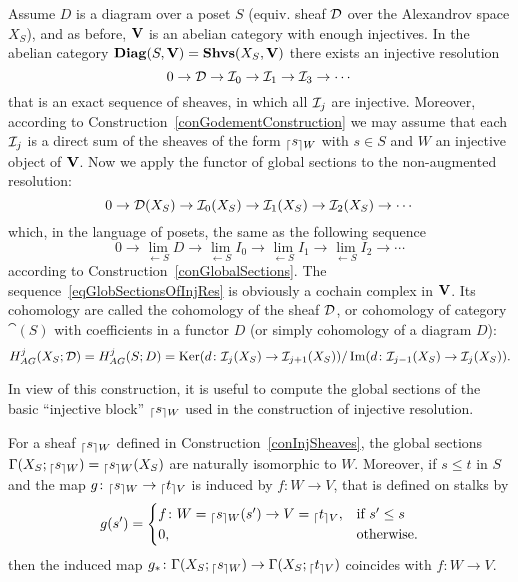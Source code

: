 \begin{con}\label{conSheafCohomDerivedStyle}
Assume $D$ is a diagram over a poset $S$ (equiv. sheaf $\mathcal{D}$ over the Alexandrov space $X_S$), and as before, $\mathbf{V}$ is an abelian category with enough injectives. In the abelian category $\mathbf{Diag}(S,\mathbf{V})=\mathbf{Shvs}(X_S,\mathbf{V})$ there exists an injective resolution
\begin{equation}\label{eqInjSheaf}
0\to \mathcal{D}\to\mathcal{I}_0\to\mathcal{I}_1\to\mathcal{I}_3\to\cdots
\end{equation}
that is an exact sequence of sheaves, in which all $\mathcal{I}_j$ are injective. Moreover, according to Construction~\ref{conGodementConstruction} we may assume that each $\mathcal{I}_j$ is a direct sum of the sheaves of the form ${_{\lceil}s_{\rceil W}}$ with $s\in S$ and $W$ an injective object of $\mathbf{V}$. Now we apply the functor of global sections to the non-augmented resolution:
\begin{equation}\label{eqGlobSectionsOfInjRes}
0\to\mathcal{D}(X_S)\to\mathcal{I}_0(X_S)\to\mathcal{I}_1(X_S)\to\mathcal{I}_2(X_S)\to\cdots
\end{equation}
which, in the language of posets, the same as the following sequence
\begin{equation}\label{eqGlobSectionsOfInjResLimits}
0\to\lim\limits_{\leftarrow S} D\to \lim\limits_{\leftarrow S} I_0\to\lim\limits_{\leftarrow S} I_1\to\lim\limits_{\leftarrow S} I_2\to\cdots
\end{equation}
according to Construction~\ref{conGlobalSections}. The sequence~\eqref{eqGlobSectionsOfInjRes} is obviously a cochain complex in $\mathbf{V}$. Its cohomology are called the cohomology of the sheaf $\mathcal{D}$, or cohomology of category $\cat(S)$ with coefficients in a functor $D$ (or simply cohomology of a diagram $D$):
\begin{equation}\label{eqCohomOfSheafAG}
H^j_{AG}(X_S;\mathcal{D})=H^j_{AG}(S;D)=\operatorname{Ker}(d\colon \mathcal{I}_j(X_S)\to \mathcal{I}_{j+1}(X_S))/\operatorname{Im}(d\colon \mathcal{I}_{j-1}(X_S)\to \mathcal{I}_j(X_S)).
\end{equation}
\end{con}

In view of this construction, it is useful to compute the global sections of the basic ``injective block'' ${_{\lceil}s_{\rceil W}}$ used in the construction of injective resolution.

\begin{lem}\label{lemGlobSecOfInjectives}
For a sheaf ${_{\lceil}s_{\rceil W}}$ defined in Construction~\ref{conInjSheaves}, the global sections $\Gamma(X_S;{_{\lceil}s_{\rceil W}})={_{\lceil}s_{\rceil W}}(X_S)$ are naturally isomorphic to $W$. Moreover, if $s\leq t$ in $S$ and the map $g\colon {_{\lceil}s_{\rceil W}}\to {_{\lceil}t_{\rceil V}}$ is induced by $f\colon W\to V$, that is defined on stalks by
\[
g(s')=\begin{cases}
        f\colon W={_{\lceil}s_{\rceil W}}(s')\to V={_{\lceil}t_{\rceil V}}, & \mbox{if } s'\leq s \\
        0, & \mbox{otherwise}.
      \end{cases}
\]
then the induced map $g_*\colon \Gamma(X_S;{_{\lceil}s_{\rceil W}})\to \Gamma(X_S;{_{\lceil}t_{\rceil V}})$ coincides with $f\colon W\to V$.
\end{lem}

